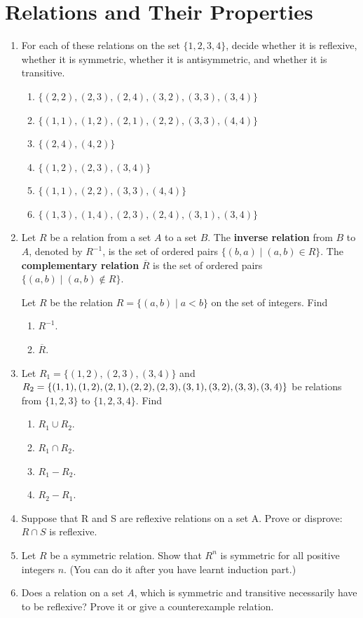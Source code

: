 \documentclass{sig-alternate-05-2015}
\begin{document}
\section{Relations and Their Properties}
\begin{enumerate}
\item For each of these relations on the set $\{1, 2, 3, 4\}$, decide
whether it is reflexive, whether it is symmetric, whether
it is antisymmetric, and whether it is transitive.
\begin{enumerate}
\item $\{(2, 2), (2, 3), (2, 4), (3, 2), (3, 3), (3, 4)\}$
\item $\{(1, 1), (1, 2), (2, 1), (2, 2), (3, 3), (4, 4)\}$
\item $\{(2, 4), (4, 2)\}$
\item $\{(1, 2), (2, 3), (3, 4)\}$
\item $\{(1, 1), (2, 2), (3, 3), (4, 4)\}$
\item $\{(1, 3), (1, 4), (2, 3), (2, 4), (3, 1), (3, 4)\}$
\end{enumerate}
\item 
Let $R$ be a relation from a set $A$ to a set $B$. The \textbf{inverse relation}
from $B$ to $A$, denoted by $R^{-1}$, is the set of ordered pairs
$\{(b, a) \mid (a, b) \in R\}$. The \textbf{complementary relation} $\overline{R}$ is the
set of ordered pairs $\{(a, b) \mid (a, b) \notin R\}$.

Let $R$ be the relation $R = \{(a, b) \mid a < b\}$ on the set of
integers. Find
\begin{enumerate}
	\item $R^{-1}$.
	\item $\overline{R}$.
\end{enumerate}
\item Let $R_1 = \{(1, 2), (2, 3), (3, 4)\}$ and $R_2 = \{(1, 1), (1, 2),\\
(2, 1), (2, 2), (2, 3), (3, 1), (3, 2), (3, 3), (3, 4)\}$ be relations
from $\{1, 2, 3\}$ to $\{1, 2, 3, 4\}$. Find
\begin{enumerate}
\item $R_1\cup R_2$. 
\item $R_1 \cap R_2$.
\item $R_1-R_2$. 
\item $R_2-R_1$.
\end{enumerate}
\item Suppose that R and S are reflexive relations on a set A.
Prove or disprove: $R \cap S$ is reflexive.

\item Let $R$ be a symmetric relation. Show that $R^n$ is symmetric for all positive integers $n$. (You can do it after you have learnt induction part.)

\item Does a relation on a set $A$, which is symmetric and transitive necessarily
have to be reflexive? Prove it or give a counterexample relation.
\end{enumerate}
\end{document}
